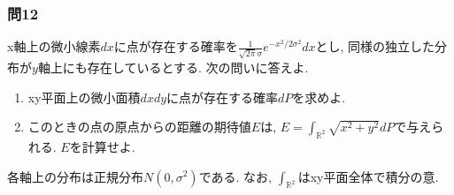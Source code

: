         \subsubsection*{問12} x軸上の微小線素$dx$に点が存在する確率を$\frac{1}{\sqrt{2\pi}\sigma}e^{-x^2/2\sigma^2}dx$とし, 同様の独立した分布が$y$軸上にも存在しているとする. 次の問いに答えよ.
            \begin{enumerate}\renewcommand{\labelenumi}{(\roman{enumi})}
                \item xy平面上の微小面積$dxdy$に点が存在する確率$dP$を求めよ.
                \item このときの点の原点からの距離の期待値$E$は, $E=\displaystyle\int_{\mathbb{R}^2}\sqrt{x^2+y^2}dP$で与えられる. $E$を計算せよ.
            \end{enumerate}
            各軸上の分布は正規分布$N(0,\sigma^2)$である. なお, $\int_{\mathbb{R}^2}$はxy平面全体で積分の意.
